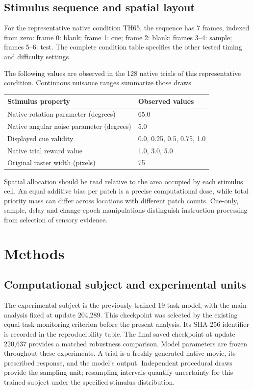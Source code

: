 \documentclass[11pt]{article}
\begin{document}
\subsection{Stimulus sequence and spatial layout}
For the representative native condition TH65, the sequence has 7 frames, indexed from zero: frame 0: blank; frame 1: cue; frame 2: blank; frames 3--4: sample; frames 5--6: test. The complete condition table specifies the other tested timing and difficulty settings.

The following values are observed in the 128 native trials of this representative condition. Continuous nuisance ranges summarize those draws.
\begin{center}\small\begin{tabular}{p{}p{}}\toprule Stimulus property & Observed values\\\midrule
Native rotation parameter (degrees) & 65.0\\
Native angular noise parameter (degrees) & 5.0\\
Displayed cue validity & 0.0, 0.25, 0.5, 0.75, 1.0\\
Native trial reward value & 1.0, 3.0, 5.0\\
Original raster width (pixels) & 75\\
\bottomrule\end{tabular}\normalsize\end{center}
Spatial allocation should be read relative to the area occupied by each stimulus cell. An equal additive bias per patch is a precise computational dose, while total priority mass can differ across locations with different patch counts. Cue-only, sample, delay and change-epoch manipulations distinguish instruction processing from selection of sensory evidence.


\section{Methods}
\subsection{Computational subject and experimental units}
The experimental subject is the previously trained 19-task model, with the main analysis fixed at update 204,289. This checkpoint was selected by the existing equal-task monitoring criterion before the present analysis. Its SHA-256 identifier is recorded in the reproducibility table. The final saved checkpoint at update 220,637 provides a matched robustness comparison. Model parameters are frozen throughout these experiments. A trial is a freshly generated native movie, its prescribed response, and the model's output. Independent procedural draws provide the sampling unit; resampling intervals quantify uncertainty for this trained subject under the specified stimulus distribution.
\end{document}
